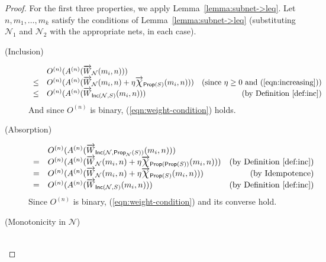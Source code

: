 \documentclass[letterpaper]{article}
\theoremstyle{definition}
\newcommand*{\bigchi}{\mbox{\Large$\chi$}}%
\newcommand{\Prop}{\textsf{Prop}}
\newcommand{\Inc}{\textsf{Inc}}
\newcommand{\Net}{\mathcal{N}}
\begin{document}
\begin{proof} For the first three properties, we apply Lemma~\ref{lemma:subnet->leq}.  Let $n, m_1, \ldots, m_k$ satisfy the conditions of Lemma~\ref{lemma:subnet->leq} (substituting $\Net_1$ and $\Net_2$ with the appropriate nets, in each case).
\begin{description}
    \item[(Inclusion)]
    \[
    \begin{array}{llr}
    
    &
    O^{(n)}(A^{(n)}(\overrightarrow{W}_{\Net}(m_i, n))) &
    \\
    
    \leq &
    O^{(n)}(A^{(n)}(\overrightarrow{W}_{\Net}(m_i, n) + \eta \overrightarrow{\bigchi}_{\Prop(S)}(m_i, n))) & 
    \mbox{(since $\eta \geq 0$ and (\ref{eqn:increasing}))}\\
    
    \leq &
    O^{(n)}(A^{(n)}(\overrightarrow{W}_{\Inc(\Net, S)}(m_i, n))) & 
    \mbox{(by Definition~\ref{def:inc})}
    \end{array}
    \]
    And since $O^{(n)}$ is binary, (\ref{eqn:weight-condition}) holds.
    
    \item[(Absorption)] 
    \[
    \begin{array}{llr}
    
    &
    O^{(n)}(A^{(n)}(\overrightarrow{W}_{\Inc(\Net, \Prop_{\Net}(S))}(m_i, n))) & 
    \\
    
    = &
    O^{(n)}(A^{(n)}(\overrightarrow{W}_{\Net}(m_i, n) + \eta \overrightarrow{\bigchi}_{\Prop(\Prop(S))}(m_i, n))) &
    \mbox{(by Definition~\ref{def:inc})}\\
    
    = &
    O^{(n)}(A^{(n)}(\overrightarrow{W}_{\Net}(m_i, n) + \eta \overrightarrow{\bigchi}_{\Prop(S)}(m_i, n))) &
    \mbox{(by Idempotence)}\\
    
    = &
    O^{(n)}(A^{(n)}(\overrightarrow{W}_{\Inc(\Net, S)}(m_i, n))) & 
    \mbox{(by Definition~\ref{def:inc})}
    \end{array}
    \]
    Since $O^{(n)}$ is binary, (\ref{eqn:weight-condition}) and its converse hold.
    
    \item[(Monotonicity in $\Net$)] 
    \[
    \begin{array}{llr}
    

\end{array}\]
\end{description}
\end{proof}
\end{document}
